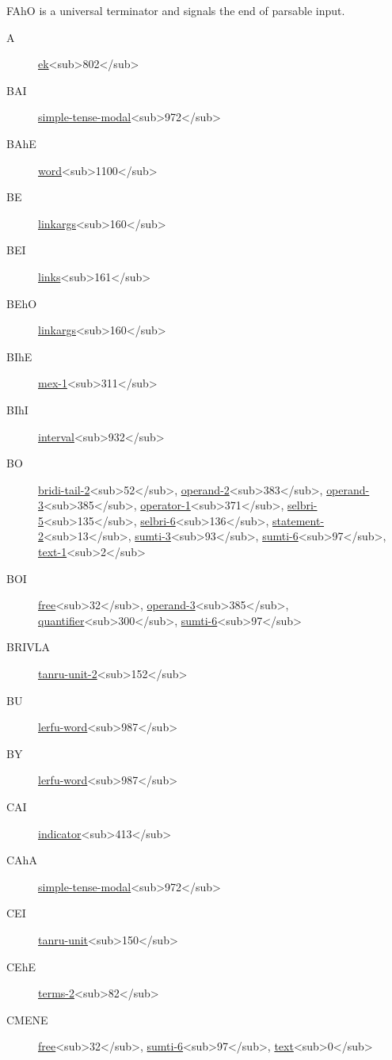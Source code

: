 FAhO is a universal terminator and signals the end of parsable
    input.



\begin{description}
\item[A] \hyperref[html:b802]{ek}<sub>802</sub>
\item[BAI] \hyperref[html:b972]{simple-tense-modal}<sub>972</sub>
\item[BAhE] \hyperref[html:b1100]{word}<sub>1100</sub>
\item[BE] \hyperref[html:b160]{linkargs}<sub>160</sub>
\item[BEI] \hyperref[html:b161]{links}<sub>161</sub>
\item[BEhO] \hyperref[html:b160]{linkargs}<sub>160</sub>
\item[BIhE] \hyperref[html:b311]{mex-1}<sub>311</sub>
\item[BIhI] \hyperref[html:b932]{interval}<sub>932</sub>
\item[BO] \hyperref[html:b52]{bridi-tail-2}<sub>52</sub>, \hyperref[html:b383]{operand-2}<sub>383</sub>, \hyperref[html:b385]{operand-3}<sub>385</sub>, \hyperref[html:b371]{operator-1}<sub>371</sub>, \hyperref[html:b135]{selbri-5}<sub>135</sub>, \hyperref[html:b136]{selbri-6}<sub>136</sub>, \hyperref[html:b13]{statement-2}<sub>13</sub>, \hyperref[html:b93]{sumti-3}<sub>93</sub>, \hyperref[html:b97]{sumti-6}<sub>97</sub>, \hyperref[html:b2]{text-1}<sub>2</sub>
\item[BOI] \hyperref[html:b32]{free}<sub>32</sub>, \hyperref[html:b385]{operand-3}<sub>385</sub>, \hyperref[html:b300]{quantifier}<sub>300</sub>, \hyperref[html:b97]{sumti-6}<sub>97</sub>
\item[BRIVLA] \hyperref[html:b152]{tanru-unit-2}<sub>152</sub>
\item[BU] \hyperref[html:b987]{lerfu-word}<sub>987</sub>
\item[BY] \hyperref[html:b987]{lerfu-word}<sub>987</sub>
\item[CAI] \hyperref[html:b413]{indicator}<sub>413</sub>
\item[CAhA] \hyperref[html:b972]{simple-tense-modal}<sub>972</sub>
\item[CEI] \hyperref[html:b150]{tanru-unit}<sub>150</sub>
\item[CEhE] \hyperref[html:b82]{terms-2}<sub>82</sub>
\item[CMENE] \hyperref[html:b32]{free}<sub>32</sub>, \hyperref[html:b97]{sumti-6}<sub>97</sub>, \hyperref[html:b0]{text}<sub>0</sub>

\end{description}
